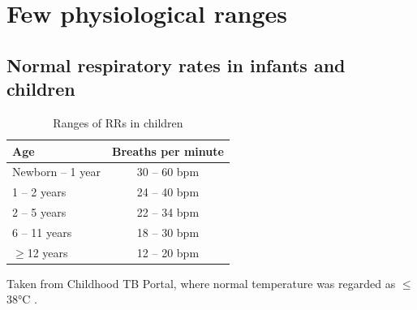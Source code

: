\documentclass[11pt,a4paper]{report}
\begin{document}
\section[Few Physiological Ranges]{Few physiological ranges}

\subsection{Normal respiratory rates in infants and children}
\begin{table}[ht]
	\centering
	\caption{Ranges of RRs in children}
	\begin{tabular}{l|c}
		\toprule[1.5pt]
		Age 		& Breaths per minute \\
		\midrule
		Newborn -- 1 year	& 30 -- 60 bpm \\
		1 -- 2 years		& 24 -- 40 bpm \\
		2 -- 5 years 		& 22 -- 34 bpm \\
		6 -- 11 years 		& 18 -- 30 bpm \\
		$\geq$12 years 		& 12 -- 20 bpm \\
		\bottomrule[1.5pt]
	\end{tabular}
	\begin{center} 
		Taken from Childhood TB Portal, where normal temperature was regarded as $\leq$38\si{\celsius}  \cite{childhoodtb}.
	\end{center}
	\label{RR}
\end{table}
\end{document}
